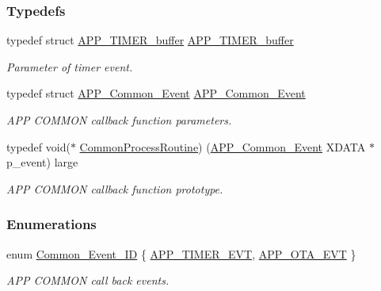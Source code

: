 \subsubsection*{Typedefs}
\begin{DoxyCompactItemize}
\item 
typedef struct \hyperlink{struct_a_p_p___t_i_m_e_r__buffer}{A\+P\+P\+\_\+\+T\+I\+M\+E\+R\+\_\+buffer} \hyperlink{group___a_p_p___c_o_m_m_o_n_ga0d6da091b255c43cd7ca44a4045e05f7}{A\+P\+P\+\_\+\+T\+I\+M\+E\+R\+\_\+buffer}\hypertarget{group___a_p_p___c_o_m_m_o_n_ga0d6da091b255c43cd7ca44a4045e05f7}{}\label{group___a_p_p___c_o_m_m_o_n_ga0d6da091b255c43cd7ca44a4045e05f7}

\begin{DoxyCompactList}\small\item\em Parameter of timer event. \end{DoxyCompactList}\item 
typedef struct \hyperlink{struct_a_p_p___common___event}{A\+P\+P\+\_\+\+Common\+\_\+\+Event} \hyperlink{group___a_p_p___c_o_m_m_o_n_gaf99ff3459fd76879773f019df1d65fff}{A\+P\+P\+\_\+\+Common\+\_\+\+Event}\hypertarget{group___a_p_p___c_o_m_m_o_n_gaf99ff3459fd76879773f019df1d65fff}{}\label{group___a_p_p___c_o_m_m_o_n_gaf99ff3459fd76879773f019df1d65fff}

\begin{DoxyCompactList}\small\item\em A\+PP C\+O\+M\+M\+ON callback function parameters. \end{DoxyCompactList}\item 
typedef void($\ast$ \hyperlink{group___a_p_p___c_o_m_m_o_n_ga58f116b4ac26c79c46d02a421f516d8c}{Common\+Process\+Routine}) (\hyperlink{struct_a_p_p___common___event}{A\+P\+P\+\_\+\+Common\+\_\+\+Event} X\+D\+A\+TA $\ast$p\+\_\+event) large\hypertarget{group___a_p_p___c_o_m_m_o_n_ga58f116b4ac26c79c46d02a421f516d8c}{}\label{group___a_p_p___c_o_m_m_o_n_ga58f116b4ac26c79c46d02a421f516d8c}

\begin{DoxyCompactList}\small\item\em A\+PP C\+O\+M\+M\+ON callback function prototype. \end{DoxyCompactList}\end{DoxyCompactItemize}
\subsubsection*{Enumerations}
\begin{DoxyCompactItemize}
\item 
enum \hyperlink{group___a_p_p___c_o_m_m_o_n_gac766f0efda77d92351cdb26d5b2c0731}{Common\+\_\+\+Event\+\_\+\+ID} \{ \hyperlink{group___a_p_p___c_o_m_m_o_n_ggac766f0efda77d92351cdb26d5b2c0731ad2637c0d5390697fbace921f956731f6}{A\+P\+P\+\_\+\+T\+I\+M\+E\+R\+\_\+\+E\+VT}, 
\hyperlink{group___a_p_p___c_o_m_m_o_n_ggac766f0efda77d92351cdb26d5b2c0731a1cadeb784383a05afebbf2b0428acc41}{A\+P\+P\+\_\+\+O\+T\+A\+\_\+\+E\+VT}
 \}\begin{DoxyCompactList}\small\item\em A\+PP C\+O\+M\+M\+ON call back events. \end{DoxyCompactList}
\end{DoxyCompactItemize}
